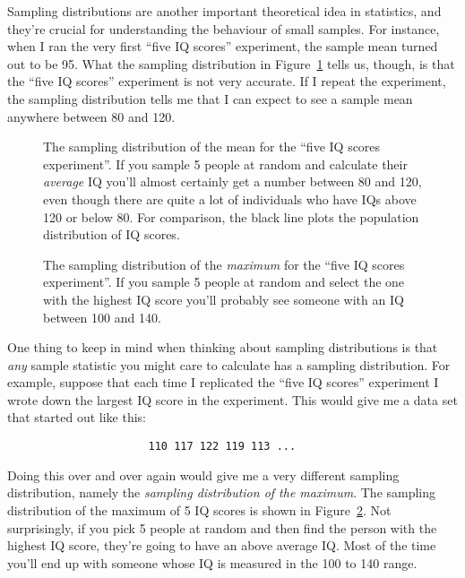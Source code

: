 Sampling distributions are another important theoretical idea in statistics, and they're crucial for understanding the behaviour of small samples. For instance, when I ran the very first ``five IQ scores'' experiment, the sample mean turned out to be 95. What the sampling distribution in Figure~\ref{fig:sampdistmean} tells us, though, is that the ``five IQ scores'' experiment is not very accurate. If I repeat the experiment, the sampling distribution tells me that I can expect to see a sample mean anywhere between 80 and 120. 

\begin{figure}[!htb]
\begin{center}
\caption{The sampling distribution of the mean for the ``five IQ scores experiment''. If you sample 5 people at random and calculate their {\it average} IQ you'll almost certainly get a number between 80 and 120, even though there are quite a lot of individuals who have IQs above 120 or below 80. For comparison, the black line plots the population distribution of IQ scores.}
\label{fig:sampdistmean}
\HR
\end{center}
\end{figure}


\begin{figure}[!htb]
\begin{center}
\caption{The sampling distribution of the {\it maximum} for the ``five IQ scores experiment''. If you sample 5 people at random and select the one with the highest IQ score you'll probably see someone with an IQ between 100 and 140.}
\label{fig:sampdistmax}
\HR
\end{center}
\end{figure}



One thing to keep in mind when thinking about sampling distributions is that {\it any} sample statistic you might care to calculate has a sampling distribution. For example, suppose that each time I replicated the ``five IQ scores'' experiment I wrote down the largest IQ score in the experiment. This would give me a data set that started out like this:
\begin{verbatim}
                      110 117 122 119 113 ... 
\end{verbatim}
Doing this over and over again would give me a very different sampling distribution, namely the {\it sampling distribution of the maximum}. The sampling distribution of the maximum of 5 IQ scores is shown in Figure~\ref{fig:sampdistmax}. Not surprisingly, if you pick 5 people at random and then find the person with the highest IQ score, they're going to have an above average IQ. Most of the time you'll end up with someone whose IQ is measured in the 100 to 140 range. 

